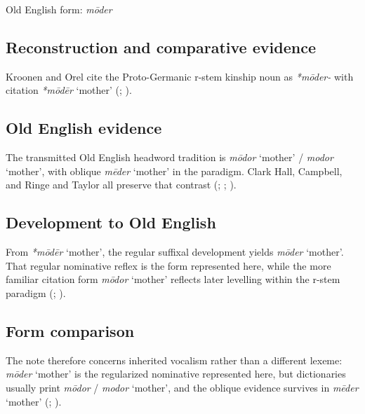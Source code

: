 \documentclass[
  british,
  a4paper,
  openany]{book}
\providecommand{\Recon}[1]{\emph{*#1}}
{\catcode`→=\active \global\def→{\ensuremath{\rightarrow}}}
\providecommand{\Recon}[1]{\emph{*#1}}
{\catcode`→=\active \global\def→{\ensuremath{\rightarrow}}}
\begin{document}
Old English form: \emph{mōder}

\subsection{Reconstruction and comparative
evidence}\label{reconstruction-and-comparative-evidence-39}

Kroonen and Orel cite the Proto-Germanic r-stem kinship noun as
\emph{*mōder-} with citation \Recon{mōdēr} `mother'
(; ).

\subsection{Old English evidence}\label{old-english-evidence-39}

The transmitted Old English headword tradition is \emph{mōdor} `mother'
/ \emph{modor} `mother', with oblique \emph{mēder} `mother' in the
paradigm. Clark Hall, Campbell, and Ringe and Taylor all preserve that
contrast (;
;
).

\subsection{Development to Old
English}\label{development-to-old-english-39}

From \Recon{mōdēr} `mother', the regular suffixal development yields
\emph{mōder} `mother'. That regular nominative reflex is the form
represented here, while the more familiar citation form \emph{mōdor}
`mother' reflects later levelling within the r-stem paradigm
(;
).

\subsection{Form comparison}\label{form-comparison-3}

The note therefore concerns inherited vocalism rather than a different
lexeme: \emph{mōder} `mother' is the regularized nominative represented
here, but dictionaries usually print \emph{mōdor} / \emph{modor}
`mother', and the oblique evidence survives in \emph{mēder} `mother'
(;
).
\end{document}
